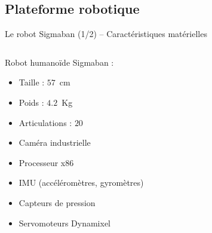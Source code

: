 
\subsection{Plateforme robotique}

\begin{frame}{Le robot Sigmaban (1/2) -- Caractéristiques matérielles}
    \begin{columns}
        \begin{column}{0.32\linewidth}
            Robot humanoïde Sigmaban :
            \begin{itemize}
                \item Taille : $57$~cm
                \item Poids : $4.2$~Kg
                \item Articulations : $20$
                \vspace{1.0em}
                \item Caméra industrielle
                \item Processeur x86
                \item IMU (accéléromètres, gyromètres)
                \item Capteurs de pression
                \item Servomoteurs Dynamixel
            \end{itemize}
        \end{column}
        \begin{column}{0.6\linewidth}
            \begin{columns}
                \begin{column}{0.4\linewidth}

\end{column}
\end{columns}
\end{column}
\end{columns}
\end{frame}
